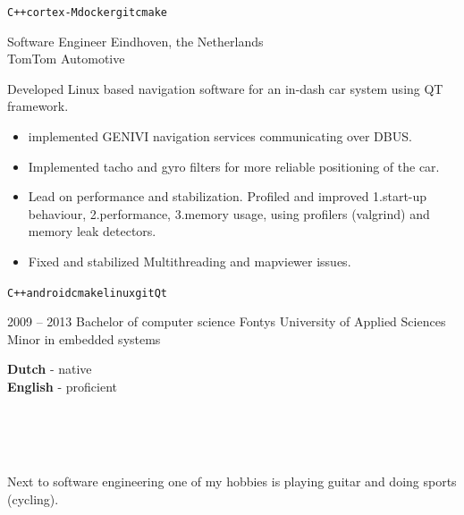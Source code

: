 \documentclass[9pt]{developercv} %
\begin{document}
\begin{entrylist}
{\begin{itemize}
          \end{itemize}
        \texttt{C++}\slashsep\texttt{cortex-M}\slashsep\texttt{docker}\slashsep\texttt{git}\slashsep\texttt{cmake}
        }
	\entry
		{}
        {Software Engineer}
        {Eindhoven, the Netherlands\\TomTom Automotive}
        {Developed Linux based navigation software for an in-dash car system using QT framework.
         \begin{itemize}
           \setlength\itemsep{-0.5em}
            \item {implemented GENIVI navigation services communicating over DBUS.}
            \item {Implemented tacho and gyro filters for more reliable positioning of the car. }
            \item {Lead on performance and stabilization. Profiled and improved 1.start-up behaviour, 2.performance, 3.memory usage, using profilers (valgrind) and memory leak detectors.}
            \item {Fixed and stabilized Multithreading and mapviewer issues.}
          \end{itemize}
        \texttt{C++}\slashsep\texttt{android}\slashsep\texttt{cmake}\slashsep\texttt{linux}\slashsep\texttt{git}\slashsep\texttt{Qt}
        }
\end{entrylist}



\begin{entrylist}
	\entry
		{2009 -- 2013}
		{Bachelor of computer science}
        {Fontys University of Applied Sciences}
        {Minor in embedded systems}
\end{entrylist}


\begin{minipage}[t]{0.3\textwidth}
	\vspace{-\baselineskip} %

	\textbf{Dutch} - native\\
	\textbf{English} - proficient\\
\end{minipage}\\\\\\
\begin{minipage}[t]{0.3\textwidth}
	\vspace{-\baselineskip} %

	Next to software engineering one of my hobbies is playing guitar and doing sports (cycling).
\end{minipage}

\end{document}
